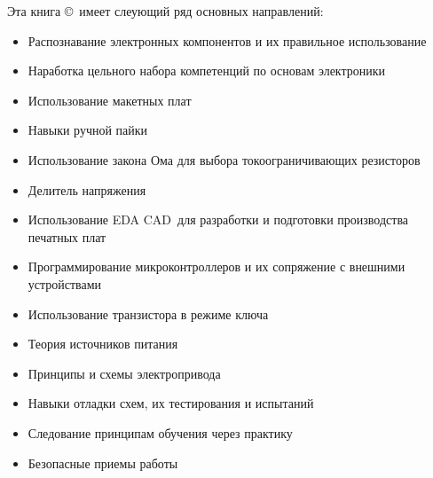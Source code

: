 
Эта книга \copyright{}\ имеет слеующий ряд основных направлений:

\begin{itemize}
\item Распознавание электронных компонентов и их правильное использование
\item Наработка цельного набора компетенций по основам электроники
\item Использование макетных плат
\item Навыки ручной пайки
\item Использование закона Ома для выбора токоограничивающих резисторов
\item Делитель напряжения
\item Использование EDA CAD\ для разработки и подготовки
производства печатных плат
\item Программирование микроконтроллеров и их сопряжение с внешними устройствами
\item Использование транзистора в режиме ключа
\item Теория источников питания
\item Принципы и схемы электропривода
\item Навыки отладки схем, их тестирования и испытаний
\item Следование принципам обучения через практику
\item Безопасные приемы работы
\end{itemize}

